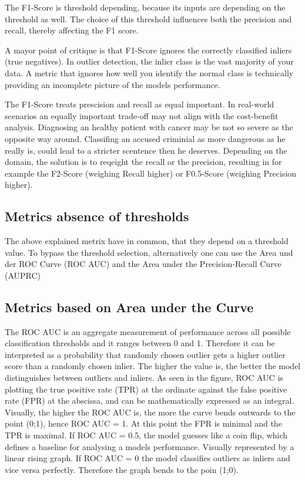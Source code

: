     The F1-Score is threshold depending, because its inputs are depending on the threshold as well.
    The choice of this threshold influences both the precision and recall, thereby affecting the F1 score.
    

    A mayor point of critique is that F1-Score ignores the correctly classified inliers (true negatives).
    In outlier detection, the inlier class is the vast majority of your data.
    A metric that ignores how well you identify the normal class is technically providing an incomplete picture of the models performance.
        
        
    The F1-Score treats prescision and recall as equal important.
    In real-world scenarios an equally important trade-off may not align with the cost-benefit analysis.
    Diagnosing an healthy patient with cancer may be not so severe as the opposite way around.
    Classifing an accused criminial as more dangerous as he really is, could lead to a stricter scentence then he deserves. 
    Depending on the domain, the solution is to reqeight the recall or the precision, resulting in for example the F2-Score (weighing Recall higher) or F0.5-Score (weighing Precision higher).

\citep[p.430]{sokolova2009systematic}
\endenumerate
{}

\subsection{Metrics absence of thresholds}
The above explained metrix have in common, that they depend on a threshold value.
To bypass the threshold selection, alternatively one can use the Area und der ROC Curve (ROC AUC) and the Area under the Precision-Recall Curve (AUPRC)


\subsection*{Metrics based on Area under the Curve}
The ROC AUC is an aggregate measurement of performance across all possible classification thresholds and it ranges between 0 and 1.
Therefore it can be interpreted as a probability that randomly chosen outlier gets a higher outlier score than a randomly chosen inlier.
The higher the value is, the better the model distinguishes between outliers and inliers.
As seen in the figure, ROC AUC is plotting the true positive rate (TPR) at the ordinate against the false positive rate (FPR) at the abscissa, and can be mathematically expressed as an integral. 
Visually, the higher the ROC AUC is, the more the curve bends outwards to the point (0;1), hence ROC AUC = 1.
At this point the FPR is minimal and the TPR is maximal.
If ROC AUC = 0.5, the model guesses like a coin flip, which defines a baseline for analysing a models performance.
Visually represented by a linear rising graph.
If  ROC AUC = 0 the model classifies outliers as inliers and vice versa perfectly.
Therefore the graph bends to the poin (1;0). 

